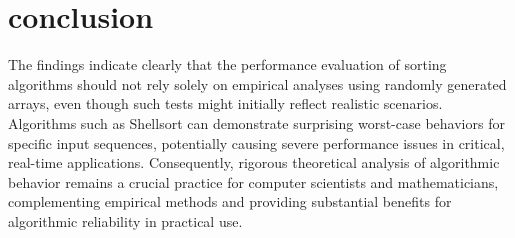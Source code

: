 \section{conclusion}

The findings indicate clearly that the performance evaluation of sorting algorithms should not rely solely on empirical analyses using randomly generated arrays, even though such tests might initially reflect realistic scenarios.
Algorithms such as Shellsort can demonstrate surprising worst-case behaviors for specific input sequences, potentially causing severe performance issues in critical, real-time applications.
Consequently, rigorous theoretical analysis of algorithmic behavior remains a crucial practice for computer scientists and mathematicians, complementing empirical methods and providing substantial benefits for algorithmic reliability in practical use.
